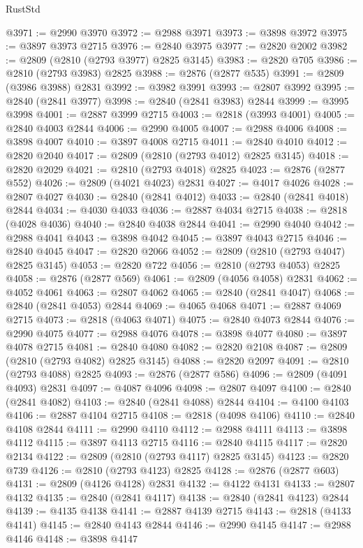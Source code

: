 \begin{lexlean}{RustStd}
\begin{coremodule}
{\begin{coremodule}
{{{{{{{{{{{{{{{{{{{{{{{{{{{{{{{{{@3971 := @2990 @3970
@3972 := @2988 @3971
@3973 := @3898 @3972
@3975 := @3897 @3973 @2715
@3976 := @2840 @3975
@3977 := @2820 @2002
@3982 := @2809 (@2810 (@2793 @3977) @2825 @3145)
@3983 := @2820 @705
@3986 := @2810 (@2793 @3983) @2825
@3988 := @2876 (@2877 @535)
@3991 := @2809 (@3986 @3988) @2831
@3992 := @3982 @3991
@3993 := @2807 @3992
@3995 := @2840 (@2841 @3977)
@3998 := @2840 (@2841 @3983) @2844
@3999 := @3995 @3998
@4001 := @2887 @3999 @2715
@4003 := @2818 (@3993 @4001)
@4005 := @2840 @4003 @2844
@4006 := @2990 @4005
@4007 := @2988 @4006
@4008 := @3898 @4007
@4010 := @3897 @4008 @2715
@4011 := @2840 @4010
@4012 := @2820 @2040
@4017 := @2809 (@2810 (@2793 @4012) @2825 @3145)
@4018 := @2820 @2029
@4021 := @2810 (@2793 @4018) @2825
@4023 := @2876 (@2877 @552)
@4026 := @2809 (@4021 @4023) @2831
@4027 := @4017 @4026
@4028 := @2807 @4027
@4030 := @2840 (@2841 @4012)
@4033 := @2840 (@2841 @4018) @2844
@4034 := @4030 @4033
@4036 := @2887 @4034 @2715
@4038 := @2818 (@4028 @4036)
@4040 := @2840 @4038 @2844
@4041 := @2990 @4040
@4042 := @2988 @4041
@4043 := @3898 @4042
@4045 := @3897 @4043 @2715
@4046 := @2840 @4045
@4047 := @2820 @2066
@4052 := @2809 (@2810 (@2793 @4047) @2825 @3145)
@4053 := @2820 @722
@4056 := @2810 (@2793 @4053) @2825
@4058 := @2876 (@2877 @569)
@4061 := @2809 (@4056 @4058) @2831
@4062 := @4052 @4061
@4063 := @2807 @4062
@4065 := @2840 (@2841 @4047)
@4068 := @2840 (@2841 @4053) @2844
@4069 := @4065 @4068
@4071 := @2887 @4069 @2715
@4073 := @2818 (@4063 @4071)
@4075 := @2840 @4073 @2844
@4076 := @2990 @4075
@4077 := @2988 @4076
@4078 := @3898 @4077
@4080 := @3897 @4078 @2715
@4081 := @2840 @4080
@4082 := @2820 @2108
@4087 := @2809 (@2810 (@2793 @4082) @2825 @3145)
@4088 := @2820 @2097
@4091 := @2810 (@2793 @4088) @2825
@4093 := @2876 (@2877 @586)
@4096 := @2809 (@4091 @4093) @2831
@4097 := @4087 @4096
@4098 := @2807 @4097
@4100 := @2840 (@2841 @4082)
@4103 := @2840 (@2841 @4088) @2844
@4104 := @4100 @4103
@4106 := @2887 @4104 @2715
@4108 := @2818 (@4098 @4106)
@4110 := @2840 @4108 @2844
@4111 := @2990 @4110
@4112 := @2988 @4111
@4113 := @3898 @4112
@4115 := @3897 @4113 @2715
@4116 := @2840 @4115
@4117 := @2820 @2134
@4122 := @2809 (@2810 (@2793 @4117) @2825 @3145)
@4123 := @2820 @739
@4126 := @2810 (@2793 @4123) @2825
@4128 := @2876 (@2877 @603)
@4131 := @2809 (@4126 @4128) @2831
@4132 := @4122 @4131
@4133 := @2807 @4132
@4135 := @2840 (@2841 @4117)
@4138 := @2840 (@2841 @4123) @2844
@4139 := @4135 @4138
@4141 := @2887 @4139 @2715
@4143 := @2818 (@4133 @4141)
@4145 := @2840 @4143 @2844
@4146 := @2990 @4145
@4147 := @2988 @4146
@4148 := @3898 @4147
}}}}}}}}}}}}}}}}}}}}}}}}}}}}}}}}}
\end{coremodule}}
\end{coremodule}
\end{lexlean}
